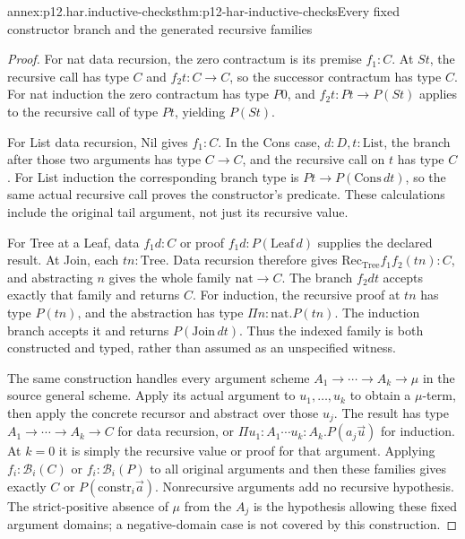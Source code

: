 \begin{annexitem}{annex:p12.har.inductive-checks}{thm:p12-har-inductive-checks}{Every fixed constructor branch and the generated recursive families}
\begin{proof}
For nat data recursion, the zero contractum is its premise \(f_1:C\).
At \(St\), the recursive call has type \(C\) and
\(f_2t:C\to C\), so the successor contractum has type \(C\).
For nat induction the zero contractum has type \(P0\), and
\(f_2t:Pt\to P(St)\) applies to the recursive call of type
\(Pt\), yielding \(P(St)\).

For List data recursion, Nil gives \(f_1:C\). In the Cons case,
\(d:D,t:\mathrm{List}\), the branch after those two arguments has
type \(C\to C\), and the recursive call on \(t\) has type
\(C\). For List induction the corresponding branch type is
\(Pt\to P(\mathrm{Cons}\,dt)\), so the same actual recursive
call proves the constructor's predicate. These calculations include
the original tail argument, not just its recursive value.

For Tree at a Leaf, data \(f_1d:C\) or proof
\(f_1d:P(\mathrm{Leaf}\,d)\) supplies the declared result.
At Join, each \(tn:\mathrm{Tree}\). Data recursion therefore gives
\(\mathrm{Rec}_{\mathrm{Tree}}f_1f_2(tn):C\), and abstracting
\(n\) gives the whole family \(\mathrm{nat}\to C\).
The branch \(f_2dt\) accepts exactly that family and returns \(C\).
For induction, the recursive proof at \(tn\) has type \(P(tn)\),
and the abstraction has type \(\Pi n:\mathrm{nat}.P(tn)\).
The induction branch accepts it and returns
\(P(\mathrm{Join}\,dt)\). Thus the indexed family is both
constructed and typed, rather than assumed as an unspecified witness.

The same construction handles every argument scheme
\(A_1\to\cdots\to A_k\to\mu\) in the source general
scheme. Apply its actual argument to \(u_1,\ldots,u_k\) to
obtain a \(\mu\)-term, then apply the concrete recursor and
abstract over those \(u_j\). The result has type
\(A_1\to\cdots\to A_k\to C\) for data recursion, or
\(\Pi u_1:A_1\cdots u_k:A_k.P(a_j\vec u)\) for induction.
At \(k=0\) it is simply the recursive value or proof for that
argument. Applying \(f_i:\mathcal B_i(C)\) or
\(f_i:\mathcal B_i(P)\) to all original arguments and then
these families gives exactly \(C\) or
\(P(\mathrm{constr}_i\vec a)\). Nonrecursive arguments add
no recursive hypothesis. The strict-positive absence of \(\mu\)
from the \(A_j\) is the hypothesis allowing these fixed argument
domains; a negative-domain case is not covered by this construction.


\end{proof}
\end{annexitem}
